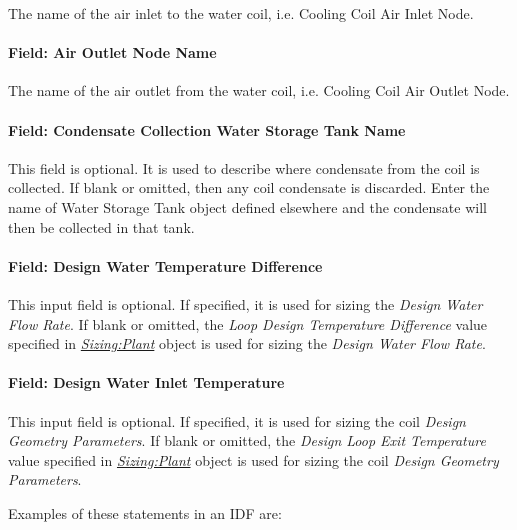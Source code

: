 The name of the air inlet to the water coil, i.e. Cooling Coil Air Inlet Node.

\paragraph{Field: Air Outlet Node Name}\label{field-air-outlet-node-name-8-000}

The name of the air outlet from the water coil, i.e. Cooling Coil Air Outlet Node.

\paragraph{Field: Condensate Collection Water Storage Tank Name}\label{field-condensate-collection-water-storage-tank-name-1}

This field is optional. It is used to describe where condensate from the coil is collected. If blank or omitted, then any coil condensate is discarded. Enter the name of Water Storage Tank object defined elsewhere and the condensate will then be collected in that tank.

\paragraph{Field: Design Water Temperature Difference}\label{field-design-water-temperature-difference}

This input field is optional. If specified, it is used for sizing the \textit{Design Water Flow Rate}. If blank or omitted, the \textit{Loop Design Temperature Difference} value specified in \textit{\hyperref[sizingplant]{Sizing:Plant}} object is used for sizing the \textit{Design Water Flow Rate}.

\paragraph{Field: Design Water Inlet Temperature}\label{field-design-water-inlet-temperature}

This input field is optional. If specified, it is used for sizing the coil \textit{Design Geometry Parameters}. If blank or omitted, the \textit{Design Loop Exit Temperature} value specified in \textit{\hyperref[sizingplant]{Sizing:Plant}} object is used for sizing the coil \textit{Design Geometry Parameters}.

Examples of these statements in an IDF are:

